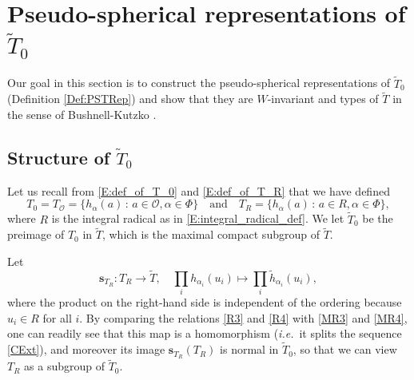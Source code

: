 \documentclass[10pt, letterpaper]{amsart}
\theoremstyle{plain}
\theoremstyle{definition}
\numberwithin{equation}{section}
\newcommand{\htt}{\tilde{h}}
\newcommand{\Tt}{\widetilde{T}}
\newcommand{\s}{\mathbf{s}}
\newcommand{\Ocal}{\mathcal{O}}
\newcommand{\ie}{{\it i.e.}\ }
\newcommand{\st}{\,:\,}
\newcommand{\qand}{{\quad\text{and}\quad}}
\begin{document}

\section{Pseudo-spherical representations of $\Tt_{0}$}\label{SecTORep}


Our goal in this section is to construct the pseudo-spherical representations of $\Tt_{0}$ (Definition \ref{Def:PSTRep}) and show that they are $W$-invariant and types of $\Tt$ in the sense of Bushnell-Kutzko \cite[(4.1) Definition]{BK98}.



\subsection{Structure of $\Tt_{0}$}



Let us recall from \eqref{E:def_of_T_0} and \eqref{E:def_of_T_R} that we have defined
\[
T_0=T_{\Ocal}=\{h_{\alpha}(a)\st a\in \Ocal, \alpha\in\Phi\}
\qand
T_R=\{h_{\alpha}(a)\st a\in R, \alpha\in\Phi\},
\]
where $R$ is the integral radical as in \eqref{E:integral_radical_def}. We let $\Tt_0$ be the preimage of $T_0$ in $\Tt$, which is the maximal compact subgroup of $\Tt$.  

Let 
\[
\s_{T_{R}}:T_{R}\longrightarrow \Tt,\quad \prod_{i}h_{\alpha_{i}}(u_{i})\mapsto \prod_{i}\htt_{\alpha_{i}}(u_{i}),
\]
where the product on the right-hand side is independent of the ordering because $u_i\in R$ for all $i$. By comparing the relations \eqref{R3} and \eqref{R4} with \eqref{MR3} and \eqref{MR4}, one can readily see that this map is a homomorphism (\ie it splits the sequence \eqref{CExt}), and moreover its image $\s_{T_R}(T_R)$ is normal in $\Tt_0$, so that we can view $T_R$ as a subgroup of $\Tt_0$.
\end{document}
